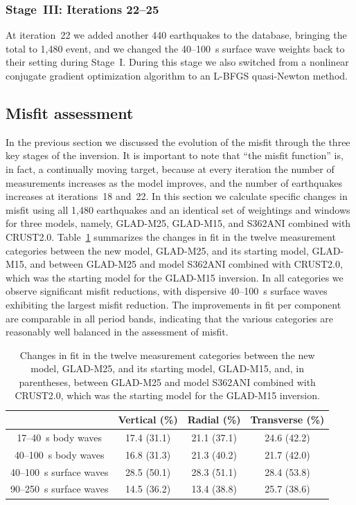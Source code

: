 \documentclass[extra,mreferee]{gji}
\begin{document}
\subsubsection{Stage~III: Iterations 22--25}

At iteration~22 we added another 440 earthquakes to the database,
bringing the total to 1,480 event,
and we changed the 40--100~s surface wave weights back to their setting during Stage~I.
During this stage we also switched from a nonlinear conjugate gradient optimization algorithm to an L-BFGS quasi-Newton method.

\subsection{Misfit assessment}

In the previous section we discussed the evolution of the misfit through the three key stages of the inversion.
It is important to note that ``the misfit function'' is, in fact, a continually moving target, because at every iteration the number of measurements increases as the model improves,
and the number of earthquakes increases at iterations~18 and~22.
In this section we calculate specific changes in misfit using all 1,480 earthquakes and an identical set of weightings and windows for three models, namely, GLAD-M25, GLAD-M15, and S362ANI combined with CRUST2.0.
Table~\ref{table:misfit_reduction_M15_M25} summarizes the changes in fit in the twelve measurement categories
between the new model, GLAD-M25, and its starting model, GLAD-M15, and between GLAD-M25 and model S362ANI combined with CRUST2.0, which was the starting model for the GLAD-M15 inversion.
In all categories we observe significant misfit reductions,
with dispersive 40--100~s surface waves exhibiting the largest misfit reduction.
The improvements in fit per component are comparable in all period bands,
indicating that the various categories are reasonably well balanced in the assessment of misfit.

\begin{table}[!htb]
  \centering
  \begin{tabular}{|c|c|c|c|}
    \hline
    ~          &  Vertical (\%) & Radial (\%) &  Transverse (\%) \\
    \hline
    17--40~s  body waves    &   17.4 (31.1)   &       21.1 (37.1) &       24.6 (42.2) \\
    40--100~s body waves    &   16.8 (31.3)  &       21.3 (40.2)  &       21.7 (42.0) \\
    40--100~s surface waves &   28.5 (50.1)  &       28.3 (51.1) &       28.4 (53.8)  \\
    90--250~s surface waves &   14.5 (36.2)  &       13.4 (38.8) &       25.7 (38.6) \\
    \hline
  \end{tabular}\\
  \caption{Changes in fit in the twelve measurement categories
between the new model, GLAD-M25, and its starting model, GLAD-M15, and, in parentheses, between GLAD-M25 and model S362ANI combined with CRUST2.0, which was the starting model for the GLAD-M15 inversion.}
  \label{table:misfit_reduction_M15_M25}
\end{table}
\end{document}
